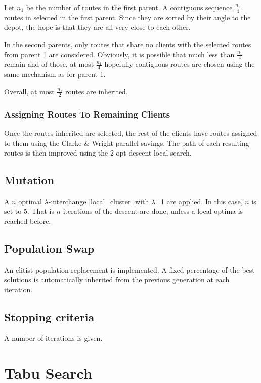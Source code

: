 \documentclass{article} %
\begin{document}
{Let $n_1$ be the number of routes in the first parent. A contiguous sequence $\frac{n_1}{4}$ routes in selected in the first parent. Since they are sorted by their angle to the depot, the hope is that they are all very close to each other.\newline

In the second parents, only routes that share no clients with the selected routes from parent 1 are considered.  Obviously, it is possible that much less than $\frac{n_1}{4}$ remain and of those, at most $\frac{n_1}{4}$ hopefully contiguous routes are chosen using the same mechanism as for parent 1.\newline

Overall, at most $\frac{n_1}{2}$ routes are inherited.

\subsubsection{Assigning Routes To Remaining Clients}

Once the routes inherited are selected, the rest of the clients have routes assigned to them using the Clarke \& Wright parallel savings. The path of each resulting routes is then improved using the 2-opt descent local search.


\subsection{Mutation}

A $n$ optimal $\lambda$-interchange \ref{local_cluster} with $\lambda$=1 are applied. In this case, $n$ is set to 5. That is $n$ iterations of the descent are done, unless a local optima is reached before.


\subsection{Population Swap}

An elitist population replacement is implemented. A fixed percentage of the best solutions is automatically inherited from the previous generation at each iteration.


\subsection{Stopping criteria}

A number of iterations is given.


\newpage
\section{Tabu Search}
\label{tabu_search}

}
\end{document}
